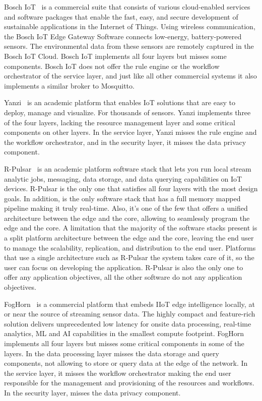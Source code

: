 Bosch IoT~\cite{bosch} is a commercial suite that consists of various cloud-enabled services and software packages that enable the fast, easy, and secure development of sustainable applications in the Internet of Things. Using wireless communication, the Bosch IoT Edge Gateway Software connects low-energy, battery-powered sensors. The environmental data from these sensors are remotely captured in the Bosch IoT Cloud. Bosch IoT implements all four layers but misses some components. Bosch IoT does not offer the rule engine or the workflow orchestrator of the service layer, and just like all other commercial systems it also implements a similar broker to Mosquitto. 

Yanzi~\cite{yanzi} is an academic platform that enables IoT solutions that are easy to deploy, manage and visualize. For thousands of sensors. Yanzi implements three of the four layers, lacking the resource management layer and some critical components on other layers. In the service layer, Yanzi misses the rule engine and the workflow orchestrator, and in the security layer, it misses the data privacy component.

R-Pulsar~\cite{8014357,8109157} is an academic platform software stack that lets you run local stream analytic jobs, messaging, data storage, and data querying capabilities on IoT devices. R-Pulsar is the only one that satisfies all four layers with the most design goals. In addition, is the only software stack that has a full memory mapped pipeline making it truly real-time. Also, it's one of the few that offers a unified architecture between the edge and the core, allowing to seamlessly program the edge and the core. A limitation that the majority of the software stacks present is a split platform architecture between the edge and the core, leaving the end user to manage the scalability, replication, and distribution to the end user. Platforms that use a single architecture such as R-Pulsar the system takes care of it, so the user can focus on developing the application. R-Pulsar is also the only one to offer any application objectives, all the other software do not any application objectives.

FogHorn~\cite{fogHorn} is a commercial platform that embeds IIoT edge intelligence locally, at or near the source of streaming sensor data. The highly compact and feature-rich solution delivers unprecedented low latency for onsite data processing, real-time analytics, ML and AI capabilities in the smallest compute footprint. FogHorn implements all four layers but misses some critical components in some of the layers. In the data processing layer misses the data storage and query components, not allowing to store or query data at the edge of the network. In the service layer, it misses the workflow orchestrator making the end user responsible for the management and provisioning of the resources and workflows. In the security layer, misses the data privacy component.

